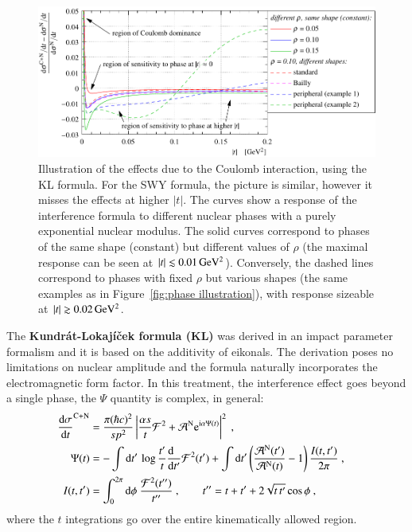 \begin{figure}
\begin{center}
\includegraphics{fig/cni_effect_illustration.pdf}
\caption{%
Illustration of the effects due to the Coulomb interaction, using the KL formula. For the SWY formula, the picture is similar, however it misses the effects at higher $|t|$. The curves show a response of the interference formula to different nuclear phases with a purely exponential nuclear modulus. The solid curves correspond to phases of the same shape (constant) but different values of $\rho$ (the maximal response can be seen at $|t| \lesssim 0.01\,{\rm GeV^2}$). Conversely, the dashed lines correspond to phases with fixed $\rho$ but various shapes (the same examples as in Figure~\ref{fig:phase illustration}), with response sizeable at $|t| \gtrsim 0.02\,{\rm GeV^2}$.
}
\label{fig:cni effect}
\end{center}
\end{figure}

The {\bf Kundr\' at-Lokaj\' i\v cek formula (KL)} \cite{kl94} was derived in an impact parameter formalism and it is based on the additivity of eikonals. The derivation poses no limitations on nuclear amplitude and the formula naturally incorporates the electromagnetic form factor. In this treatment, the interference effect goes beyond a single phase, the $\Psi$ quantity is complex, in general:
\begin{equation}
\label{eq:int kl}
	\begin{aligned}
		{\d\sigma\over \d t}^{\rm C+N} &= {\pi (\hbar c)^2 \over s p^2} \left | {\alpha s\over t} {\cal F}^2 + {\cal A}^{\rm N} \e^{\I\alpha \Psi(t)} \right |^2\ ,\cr
		\Psi(t) &= 
			- \int \d t'\, \log {t'\over t} {\d\phantom{t'}\over \d t'} {\cal F}^2(t') + \int \d t' \left( {{\cal A}^{\rm N}(t') \over {\cal A}^{\rm N}(t)} - 1 \right) { I(t, t')\over 2\pi }
			\ ,\cr
		I(t, t') &= \int_0^{2\pi} \d\phi\ {{\cal F}^2(t'')\over t''}\ ,\qquad t'' = t + t' + 2\sqrt{t\, t'} \cos\phi\ ,\cr
	\end{aligned}
\end{equation}
where the $t$ integrations go over the entire kinematically allowed region.

